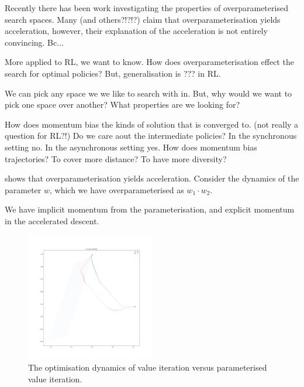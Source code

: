 Recently there has been work investigating the properties of overparameterised search spaces.
Many \cite{Arora2018} (and others?!?!?) claim that overparameterisation yields acceleration, however,
their explanation of the acceleration is not entirely convincing. Bc...

More applied to RL, we want to know. How does overparameterisation effect the search for optimal policies?
But, generalisation is ??? in RL.


We can pick any space we we like to search with in. But, why would we want to pick one space over another?
What properties are we looking for?



How does momentum bias the kinds of solution that is converged to. (not really a question for RL?!)
Do we care aout the intermediate policies? In the synchronous setting no. In the asynchronous setting yes.
How does momentum bias trajectories? To cover more distance? To have more diversity?


\cite{Arora2018} shows that overparameterisation yields acceleration. Consider
the dynamics of the parameter $w$, which we have overparameterised as $w_1 \cdot w_2$.



We have implicit momentum from the parameterisation, and explicit momentum in the accelerated descent.



\begin{figure}
\centering
\includegraphics[width=0.5\textwidth,height=0.5\textheight]{../../pictures/figures/vi-vs-pvi.png}
\caption{The optimisation dynamics of value iteration versus parameterised value iteration.}
\end{figure}

